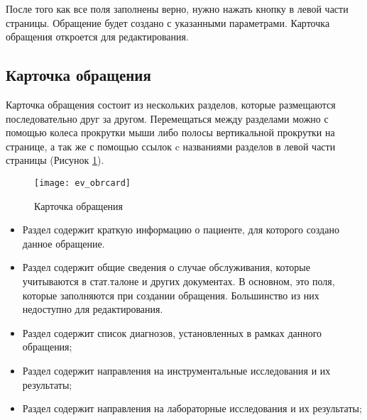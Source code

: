 {После того как все поля заполнены верно, нужно нажать кнопку  в левой части страницы. Обращение будет создано с указанными параметрами.  Карточка обращения откроется для редактирования.

\subsection{Карточка обращения} \label{ev_obr}

Карточка обращения состоит из нескольких разделов, которые размещаются последовательно друг за другом. Перемещаться  между разделами можно с помощью колеса прокрутки мыши либо полосы вертикальной прокрутки на странице, а так же с помощью ссылок c названиями разделов в левой части страницы (Рисунок \ref{img_ev_obrcard}). 

\begin{figure}[!ht]\centering
	\texttt{[image: ev\_obrcard]}
	\caption{Карточка обращения}
	\label{img_ev_obrcard}
\end{figure}

\begin{itemize}
 \item Раздел  содержит краткую информацию о пациенте, для которого создано данное обращение. 
 \item Раздел  содержит общие сведения о случае обслуживания, которые учитываются в стат.талоне и других документах. В основном, это поля, которые заполняются при создании обращения. Большинство из них недоступно для редактирования.
 \item Раздел  содержит список диагнозов, установленных в рамках данного обращения;
 \item Раздел  содержит направления на инструментальные исследования и их результаты;
 \item Раздел  содержит направления на лабораторные исследования и их результаты;
\end{itemize}
 
}
